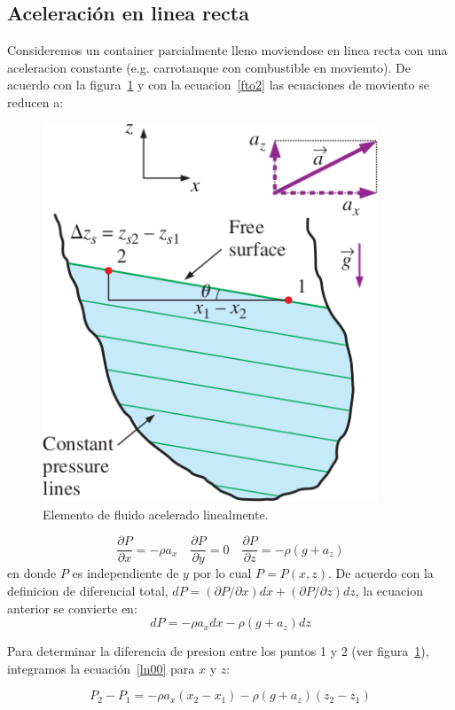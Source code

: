 \documentclass[10pt, oneside]{article}
\begin{document}
\subsection{Aceleraci\'on en linea recta}
Consideremos un container parcialmente lleno moviendose en linea recta con una aceleracion constante (e.g. carrotanque con combustible en moviemto). De acuerdo con la figura~\ref{rigi} y con la ecuacion~\ref{fto2} las ecuaciones de  moviento se reducen a:
\begin{figure}[h]
\centering
\includegraphics[width=10cm]{rigi}
\caption{Elemento de fluido acelerado linealmente.}
\label{rigi}
\end{figure}


$$
\frac{\partial P}{\partial x}=-\rho a_x \quad \frac{\partial P}{\partial y} = 0 \quad \frac{\partial P}{\partial z}=-\rho(g+ a_z)
$$
en donde $P$ es independiente de $y$ por lo cual $P=P(x,z)$. De acuerdo con la definicion de diferencial total, $dP = (\partial P / \partial x)dx + (\partial P / \partial z)dz$, la ecuacion anterior se convierte en:
\begin{equation}
dP = -\rho a_x dx - \rho(g + a_z)dz
\label{ln00}
\end{equation}

Para determinar la diferencia de presion entre los puntos 1 y 2 (ver figura~\ref{rigi}), integramos la ecuaci\'on~\ref{ln00} para $x$ y $z$:

\begin{equation}
P_2 - P_1 = -\rho a_x (x_2 - x_1 ) - \rho(g+ a_z )(z_2 - z_1 )
\label{ln0}
\end{equation}
\end{document}
